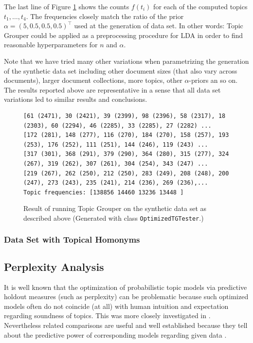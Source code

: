 \documentclass[10pt, a4paper, oneside]{article}
\begin{document}
The last line of Figure \ref{tgresult} shows the counts $f(t_i)$ for each of the computed topics $t_1,\ldots,t_4$. The frequencies closely match the ratio of the prior $\alpha = (5, 0.5, 0.5, 0.5)^\top$ used at the generation of data set. In other words: Topic Grouper could be applied as a preprocessing procedure for LDA in order to find reasonable hyperparameters for $n$ and $\alpha$.

Note that we have tried many other variations when parametrizing the generation of the synthetic data set including other document sizes (that also vary across documents), larger document collections, more topics, other $\alpha$-priors an so on. The results reported above are representative in a sense that all data set variations led to similar results and conclusions.

\begin{figure}
{\tiny
\begin{verbatim}
[61 (2471), 30 (2421), 39 (2399), 98 (2396), 58 (2317), 18 (2303), 60 (2294), 46 (2285), 33 (2285), 27 (2282) ...
[172 (281), 148 (277), 116 (270), 184 (270), 158 (257), 193 (253), 176 (252), 111 (251), 144 (246), 119 (243) ...
[317 (301), 368 (291), 379 (290), 364 (280), 315 (277), 324 (267), 319 (262), 307 (261), 304 (254), 343 (247) ...
[219 (267), 262 (250), 212 (250), 283 (249), 208 (248), 200 (247), 273 (243), 235 (241), 214 (236), 269 (236),...
Topic frequencies: [138856 14460 13236 13448 ]\end{verbatim}}
\caption{Result of running Topic Grouper on the synthetic data set as described above (Generated with class \texttt{OptimizedTGTester}.)}
\label{tgresult}
\end{figure}

\subsubsection{Data Set with Topical Homonyms}

\subsection{Perplexity Analysis}

It is well known that the optimization of probabilistic topic models via predictive holdout measures (such as perplexity) can be problematic because such optimized models often do not coincide (at all) with human intuition and expectation regarding soundness of topics.
This was more closely investigated in \cite{Chang:Boyd-Graber:Wang:Gerrish:Blei-2009}. Nevertheless related comparisons are useful and well established because they tell about the predictive power of corresponding models regarding given data \cite{Blei:2003:LDA:944919.944937, chen:wang}.
\end{document}
